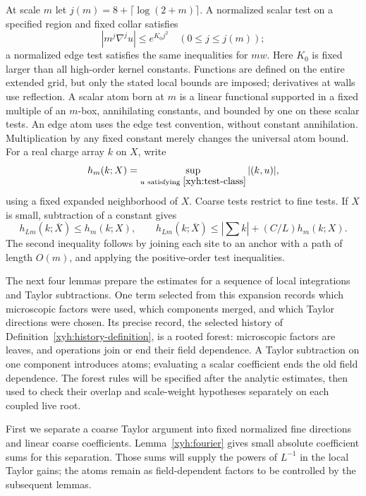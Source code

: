 At scale $m$ let $j(m)=8+\lceil\log(2+m)\rceil$. A normalized scalar
test on a specified region and fixed collar satisfies
\begin{equation}\label{xyh:test-class}
 |m^j\nabla^j u|\le e^{K_0j^2}\quad(0\le j\le j(m));
\end{equation}
a normalized edge test satisfies the same inequalities for $m w$.
Here $K_0$ is fixed larger than all high-order kernel constants. Functions
are defined on the entire extended grid, but only the stated local bounds
are imposed; derivatives at walls use reflection. A scalar atom born at
$m$ is a linear functional supported in a fixed multiple of an $m$-box,
annihilating constants, and bounded by one on these scalar tests. An edge
atom uses the edge test convention, without constant annihilation.
Multiplication by any fixed constant merely changes the universal atom
bound. For a real charge array $k$ on $X$, write
\[
 h_m(k;X)=\sup_{u\text{ satisfying }\eqref{xyh:test-class}}
                |(k,u)|,
\]
using a fixed expanded neighborhood of $X$. Coarse tests restrict to fine
tests. If $X$ is small, subtraction of a constant gives
\begin{equation}\label{xyh:test-coarsening}
 h_{Lm}(k;\overline X)\le h_m(k;X),\qquad
 h_{Lm}(k;\overline X)\le |\textstyle\sum k|+(C/L)h_m(k;X).
\end{equation}
The second inequality follows by joining each site to an anchor with a
path of length $O(m)$, and applying the positive-order test inequalities.

The next four lemmas prepare the estimates for a sequence of local
integrations and Taylor subtractions.  One term selected from this
expansion records which microscopic factors were used, which components
merged, and which Taylor directions were chosen.  Its precise record,
the selected history of Definition~\ref{xyh:history-definition}, is a
rooted forest: microscopic factors are leaves, and operations join or
end their field dependence.  A Taylor subtraction on one component
introduces atoms; evaluating a scalar coefficient ends the old field
dependence.  The forest rules will be specified after the analytic
estimates, then used to check their overlap and scale-weight hypotheses
separately on each coupled live root.

First we separate a coarse Taylor argument into fixed normalized fine
directions and linear coarse coefficients.  Lemma~\ref{xyh:fourier}
gives small absolute coefficient sums for this separation.  Those sums
will supply the powers of $L^{-1}$ in the local Taylor gains; the atoms
remain as field-dependent factors to be controlled by the subsequent
lemmas.

